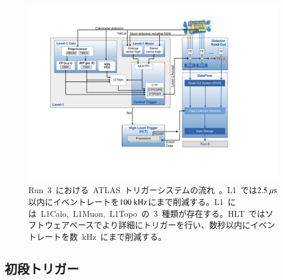 \begin{figure}[H]
        \centering   
            \includegraphics[width=\textwidth,page=2]{img/pdf/tdaq-run3-schematic-withoutFTK.pdf}
        \caption[Run~3~における~ATLAS~トリガーシステムの流れ]{Run~3~における~ATLAS~トリガーシステムの流れ~\cite{URL:07}。L1~では$2.5~\mu\rm{s}$以内にイベントレートを$100~\rm{kHz}$にまで削減する。L1~には~L1Calo,~L1Muon,~L1Topo~の~3~種類が存在する。HLT~ではソフトウェアベースでより詳細にトリガーを行い、数秒以内にイベントレートを数~kHz~にまで削減する。}\label{fig:trigger}
\end{figure}

\subsection{初段トリガー}\label{subsec:l1tri}

